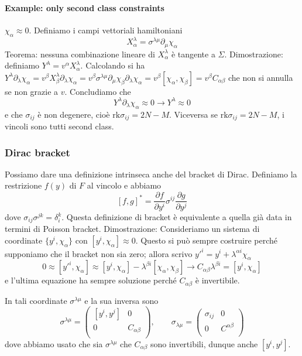 \documentclass[a4paper, 11pt]{article}
\newcommand{\pderiv}[2]{\dfrac{\partial #1}{\partial #2}}
\begin{document}
	\paragraph{Example: only second class constraints}
	$\chi_\alpha\approx 0$. Definiamo i campi vettoriali hamiltoniani
	\[ X^\lambda_\alpha = \sigma^{\lambda\mu} \partial_\mu \chi_\alpha \]
	Teorema: nessuna combinazione lineare di $X^\lambda_\alpha$ è tangente a $\Sigma$. Dimostrazione: definiamo $Y^\lambda = v^\alpha X^\lambda_\alpha$. Calcolando si ha $Y^\lambda \partial_\lambda \chi_\alpha = v^\beta X^\lambda_\beta \partial_\lambda \chi_\alpha = v^\beta \sigma^{\lambda\mu} \partial_\mu \chi_\beta \partial_\lambda \chi_\alpha = v^\beta [\chi_\alpha, \chi_\beta] = v^\beta C_{\alpha\beta}$ che non si annulla se non grazie a $v$. Concludiamo che
	\[ Y^\lambda \partial_\lambda \chi_\alpha \approx 0 \rightarrow Y^\lambda \approx 0 \]
	e che $\sigma_{ij}$ è non degenere, cioè $\mathrm{rk} \sigma_{ij} = 2N-M $. Viceversa se $\mathrm{rk} \sigma_{ij} = 2N-M$, i vincoli sono tutti second class.
	
	\subsubsection{Dirac bracket}
	Possiamo dare una definizione intrinseca anche del bracket di Dirac. Definiamo la restrizione $f(y)$ di $F$ al vincolo e abbiamo
	\[ [f,g]^* = \pderiv{f}{y^i}\sigma^{ij}\pderiv{g}{y^j} \]
	dove $\sigma_{ij}\sigma^{jk} = \delta^k_i$. Questa definizione di bracket è equivalente a quella già data in termini di Poisson bracket. Dimostrazione:
	Consideriamo un sistema di coordinate $\{y^i,\chi_\alpha\}$ con $[y^i, \chi_\alpha]\approx 0$. Questo si può sempre costruire perché supponiamo che il bracket non sia zero; allora scrivo $y'^i = y^i + \lambda^{\alpha i} \chi_\alpha$
	\[ 0 \approx [y'^i, \chi_\alpha] \approx [y^i, \chi_\alpha] - \lambda^{\beta i} [\chi_\alpha, \chi_\beta] \rightarrow C_{\alpha\beta} \lambda^{\beta i} = [y^i, \chi_\alpha] \]
	e l'ultima equazione ha sempre soluzione perché $C_{\alpha\beta}$ è invertibile.
	
	In tali coordinate $\sigma^{\lambda\mu}$ e la sua inversa sono
	\[ \sigma^{\lambda\mu} = \begin{pmatrix}
	[y^i, y^j] & 0 \\
	0 & C_{\alpha\beta} \\
	\end{pmatrix},\qquad
	\sigma_{\lambda\mu} = \begin{pmatrix}
	\sigma_{ij} & 0 \\
	0 & C^{\alpha\beta} \\
	\end{pmatrix} \]
	dove abbiamo usato che sia $\sigma^{\lambda\mu}$ che $C_{\alpha\beta}$ sono invertibili, dunque anche $[y^i, y^j]$.
	
\end{document}
